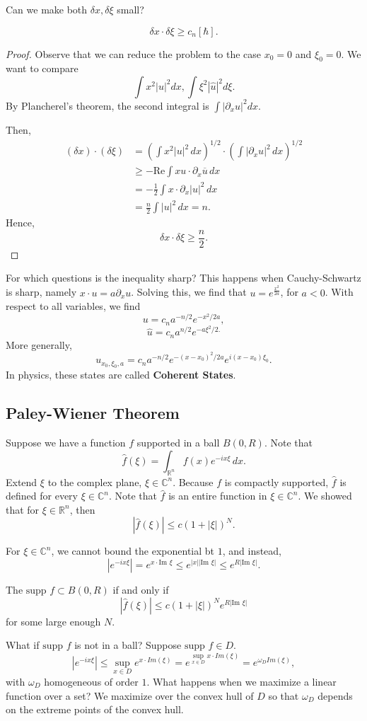 \documentclass[11pt]{scrartcl}
\newcommand{\R}{\mathbb{R}}
\newcommand{\C}{\mathbb C}
\renewcommand{\hat}{\widehat}
\newcommand{\supp}{\text{supp }}
\begin{document}
Can we make both $\delta x, \delta \xi$ small?  
\begin{thm} 
$$\delta x \cdot \delta \xi \ge c_n[\hbar].$$
\end{thm}
\begin{proof}
Observe that we can reduce the problem to the case $x_0 = 0$ and $\xi_0 = 0$.  We want to compare 
$$\int x^2 |u|^2 dx, \int \xi^2 |\hat{u}|^2 d\xi.$$
By Plancherel's theorem, the second integral is $\int |\partial_x u|^2 dx.$

Then,
\begin{align*}
(\delta x) \cdot (\delta \xi) &= \left (\int x^2 |u|^2\, dx\right)^{1/2} \cdot \left (\int |\partial_x u|^2\,dx\right)^{1/2}  \\
&\ge - \text{Re} \int xu \cdot \partial_x \overline{u} \,dx\\ 
&= - \frac{1}{2}\int x \cdot \partial_x |u|^2 \, dx\\
&= \frac{n}{2}\int |u|^2 \, dx = n.
\end{align*}
Hence, 
$$\delta x \cdot \delta \xi \ge \frac{n}{2}.$$
\end{proof}
For which questions is the inequality sharp?  This happens when Cauchy-Schwartz is sharp, namely $x \cdot u = a \partial_x u$.
Solving this, we find that $u = e^{\frac{x^2}{2a}}$, for $a < 0$.  With respect to all variables, we find 
$$u = c_n a^{-n/2}e^{-x^2/2a},$$
$$\hat{u} = c_n a^{n/2} e^{-a\xi^2/2.}$$
More generally,
$$u_{x_0, \xi_0, a} = c_n a^{-n/2} e^{-(x - x_0)^2/2a}e^{i(x -x_0)\xi_0}.$$
In physics, these states are called \textbf{Coherent States}.
\subsection{Paley-Wiener Theorem}
Suppose we have a function $f$ supported in a ball $B(0, R)$.  Note that 
$$\hat{f}(\xi) = \int_{\R^n} f(x)e^{-ix \xi}\, dx.$$
Extend $\xi$ to the complex plane, $\xi \in \C^n$.  Because $f$ is compactly supported, $\hat{f}$ is defined for every $\xi \in \C^n$.  Note that $\hat{f}$ is an entire function in $\xi \in \C^n$.  We showed that for $\xi \in \R^n$, then $$|\hat{f}(\xi)| \le c(1 + |\xi|)^N.$$

For $\xi \in \C^n$, we cannot bound the exponential bt $1$, and instead,
$$|e^{-ix \xi}| = e^{x \cdot \text{Im }  \xi} \le e^{|x| |\text{Im }\xi| }\le e^{R |\text{Im }\xi|}.$$
\begin{thm} The $\supp f \subset B(0, R)$ if and only if 
$$|\hat{f}(\xi)| \le c(1 + |\xi|)^Ne^{R |\text{Im }\xi|}$$
for some large enough $N$.  
\end{thm}
What if $\supp f$ is not in a ball?  Suppose $\supp f \in D$.  
$$|e^{-ix\xi}| \le \sup_{x \in D} e^{x \cdot Im (\xi)} = e^{\sup_{x \in D} x \cdot Im (\xi)} = e^{\omega_D Im(\xi)},$$
with $\omega_D$ homogeneous of order $1$.  What happens when we maximize a linear function over a set?  We maximize over the convex hull of $D$ so that $\omega_D$ depends on the extreme points of the convex hull.  
\end{document}
